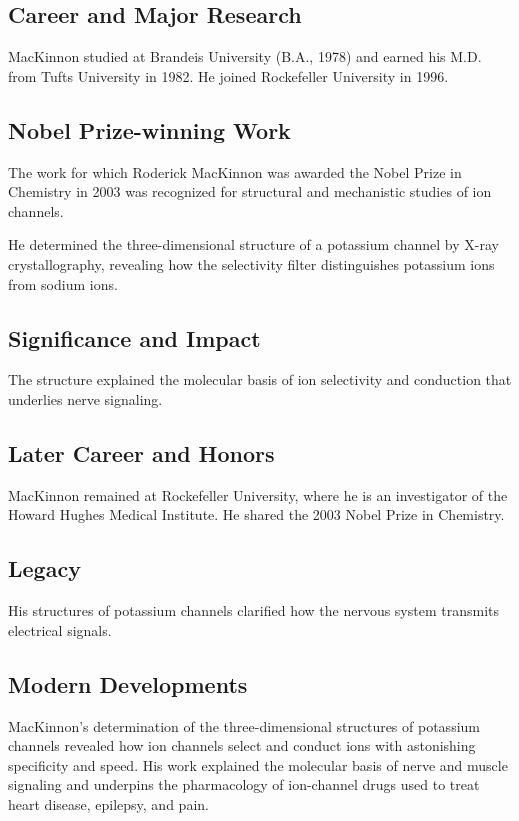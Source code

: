 \subsection*{Career and Major Research}

MacKinnon studied at Brandeis University (B.A., 1978) and earned his M.D. from Tufts University in 1982. He joined Rockefeller University in 1996.

\subsection*{Nobel Prize-winning Work}

The work for which Roderick MacKinnon was awarded the Nobel Prize in Chemistry in 2003 was recognized for structural and mechanistic studies of ion channels.

He determined the three-dimensional structure of a potassium channel by X-ray crystallography, revealing how the selectivity filter distinguishes potassium ions from sodium ions.

\subsection*{Significance and Impact}

The structure explained the molecular basis of ion selectivity and conduction that underlies nerve signaling.

\subsection*{Later Career and Honors}

MacKinnon remained at Rockefeller University, where he is an investigator of the Howard Hughes Medical Institute. He shared the 2003 Nobel Prize in Chemistry.

\subsection*{Legacy}

His structures of potassium channels clarified how the nervous system transmits electrical signals.

\subsection*{Modern Developments}

MacKinnon's determination of the three-dimensional structures of potassium channels revealed how ion channels select and conduct ions with astonishing specificity and speed. His work explained the molecular basis of nerve and muscle signaling and underpins the pharmacology of ion-channel drugs used to treat heart disease, epilepsy, and pain.

